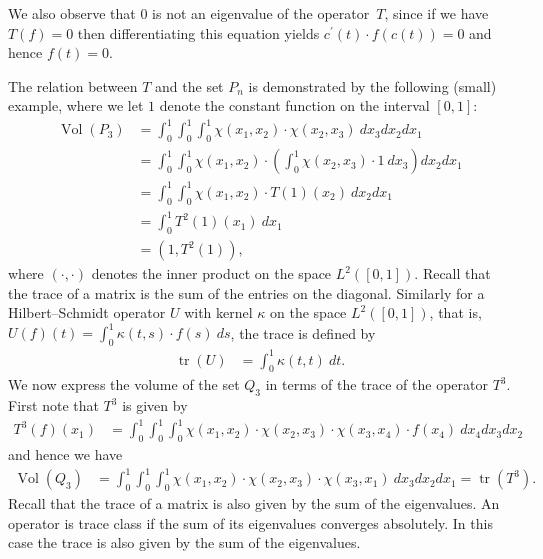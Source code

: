 \documentclass[11pt,reqno]{amsart}
\theoremstyle{definition}
\numberwithin{equation}{section}
\DeclareMathOperator{\trace}{tr}
\DeclareMathOperator{\Vol}{Vol}
\begin{document}
We also observe that $0$ is not an eigenvalue of the operator~$T$,
since if we have $T(f) = 0$ then differentiating
this equation yields
$c^{\prime}(t) \cdot f(c(t)) = 0$
and hence $f(t) = 0$.



The relation between $T$ and the set $P_{n}$
is demonstrated by the following (small) example,
where we let $1$ denote the constant function on the interval $[0,1]$:
\begin{align*}
\Vol(P_{3})
& =
\int_{0}^{1} \int_{0}^{1} \int_{0}^{1} \chi(x_{1},x_{2}) \cdot \chi(x_{2},x_{3}) \: dx_{3}dx_{2}dx_{1} \\
& =
\int_{0}^{1} \int_{0}^{1} \chi(x_{1},x_{2}) \cdot
\left(\int_{0}^{1} \chi(x_{2},x_{3}) \cdot 1 \: dx_{3} \right)
dx_{2}dx_{1} \\
& =
\int_{0}^{1} \int_{0}^{1} \chi(x_{1},x_{2}) \cdot
T(1)(x_{2}) \:
dx_{2}dx_{1} \\
& =
\int_{0}^{1} T^{2}(1)(x_{1}) \: dx_{1} \\
& =
(1, T^{2}(1)) ,
\end{align*}
where $(\cdot,\cdot)$ denotes the inner product on the space $L^{2}([0,1])$.
Recall that the trace of a matrix is the sum of the entries on the diagonal.
Similarly for a Hilbert--Schmidt operator $U$
with kernel $\kappa$ on the space $L^{2}([0,1])$,
that is,
$U(f)(t) = \int_{0}^{1} \kappa(t,s) \cdot f(s) \: ds$,
the trace is defined by
\begin{align*}
\trace(U)
& =
\int_{0}^{1} \kappa(t,t) \: dt .
\end{align*}
We now express the volume of the set $Q_{3}$ in terms of the trace
of the operator $T^{3}$.
First note that $T^{3}$ is given by
\begin{align*}
T^{3}(f)(x_{1})
& =
\int_{0}^{1} \int_{0}^{1} \int_{0}^{1} \chi(x_{1},x_{2}) \cdot \chi(x_{2},x_{3}) \cdot \chi(x_{3},x_{4})
\cdot f(x_{4})
\: dx_{4}dx_{3}dx_{2} 
\end{align*}
and hence we have
\begin{align*}
\Vol(Q_{3})
& =
\int_{0}^{1} \int_{0}^{1} \int_{0}^{1} \chi(x_{1},x_{2}) \cdot \chi(x_{2},x_{3}) \cdot \chi(x_{3},x_{1})
\: dx_{3}dx_{2}dx_{1}
=
\trace(T^{3}) .
\end{align*}
Recall that the trace of a matrix is also given by the sum of the eigenvalues.
An operator is trace class if the sum of its eigenvalues converges absolutely.
In this case the trace is also given by the sum of the eigenvalues.
\end{document}
